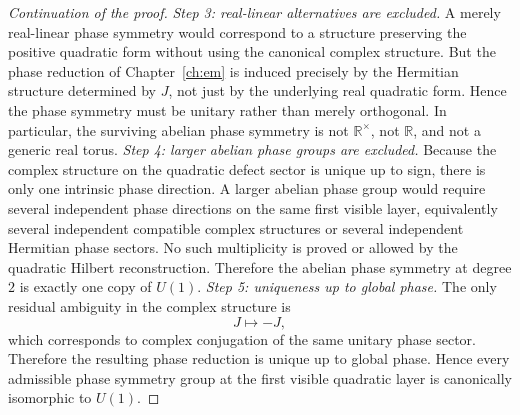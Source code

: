 \begin{proof}[Continuation of the proof]
	\smallskip
	\noindent\emph{Step 3: real-linear alternatives are excluded.}
	A merely real-linear phase symmetry would correspond to a structure
	preserving the positive quadratic form without using the canonical
	complex structure.
	But the phase reduction of Chapter~\ref{ch:em} is induced precisely by
	the Hermitian structure determined by \(J\), not just by the underlying real
	quadratic form.
	Hence the phase symmetry must be unitary rather than merely orthogonal.
	In particular, the surviving abelian phase symmetry is not
	\(\mathbb R^\times\), not \(\mathbb R\), and not a generic real torus.
	\smallskip
	\noindent\emph{Step 4: larger abelian phase groups are excluded.}
	Because the complex structure on the quadratic defect sector is unique up
	to sign, there is only one intrinsic phase direction.
	A larger abelian phase group would require several independent phase
	directions on the same first visible layer, equivalently several
	independent compatible complex structures or several independent
	Hermitian phase sectors.
	No such multiplicity is proved or allowed by the quadratic Hilbert
	reconstruction.
	Therefore the abelian phase symmetry at degree $2$ is exactly one copy of
	\(U(1)\).
	\smallskip
	\noindent\emph{Step 5: uniqueness up to global phase.}
	The only residual ambiguity in the complex structure is
	\[
		J\mapsto -J,
	\]
	which corresponds to complex conjugation of the same unitary phase
	sector.
	Therefore the resulting phase reduction is unique up to global phase.
	Hence every admissible phase symmetry group at the first visible
	quadratic layer is canonically isomorphic to \(U(1)\).
\end{proof}

